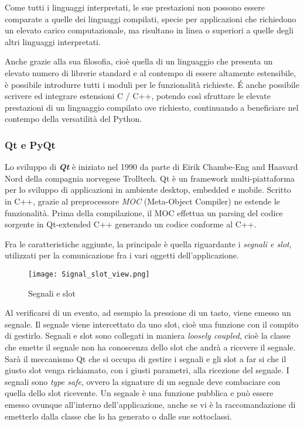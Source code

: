 Come tutti i linguaggi interpretati, le sue prestazioni non possono essere comparate a quelle dei linguaggi compilati, specie per applicazioni che richiedono un elevato carico computazionale, ma risultano in linea o superiori a quelle degli altri linguaggi interpretati.

Anche grazie alla sua filosofia, cioè quella di un linguaggio che presenta un elevato numero di librerie standard e al contempo di essere altamente estensibile, è possibile introdurre tutti i moduli per le funzionalità richieste. 
\'E anche possibile scrivere ed integrare estensioni C / C++, potendo così sfruttare le elevate prestazioni di un linguaggio compilato ove richiesto, continuando a beneficiare nel contempo della versatilità del Python.  

\subsubsection{Qt e PyQt} 
\nocite{Qt}
\nocite{PyQt}
Lo sviluppo di \textbf{\textit{Qt}} è iniziato nel 1990 da parte di Eirik Chambe-Eng and Haavard Nord della compagnia norvegese Trolltech. Qt è un framework multi-piattaforma per lo sviluppo di applicazioni in ambiente desktop, embedded e mobile. Scritto in C++, grazie al preprocessore \textit{MOC} (Meta-Object Compiler) ne estende le funzionalità.
Prima della compilazione, il MOC effettua un parsing del codice sorgente in Qt-extended C++ generando un codice conforme al C++. 

Fra le caratteristiche aggiunte, la principale è quella riguardante i \textit{segnali e slot}, utilizzati per la comunicazione fra i vari oggetti dell'applicazione. 

\begin{figure}[htpb]
	\begin{center}
		\texttt{[image: Signal\_slot\_view.png]}
	\end{center}
	\caption[Segnali e slot]{Segnali e slot \footnotemark}
\end{figure}


Al verificarsi di un evento, ad esempio la pressione di un tasto, viene emesso un segnale. Il segnale viene intercettato da uno slot, cioè una funzione con il compito di gestirlo. 
Segnali e slot sono collegati in maniera \textit{loosely coupled}, cioè la classe che emette il segnale non ha conoscenza dello slot che andrà a ricevere il segnale. Sarà il meccanismo Qt che si occupa di gestire i segnali e gli slot a far si che il giusto slot venga richiamato, con i giusti parametri, alla ricezione del segnale. I segnali sono \textit{type safe}, ovvero la signature di un segnale deve combaciare con quella dello slot ricevente. Un segnale è una funzione pubblica e può essere emesso ovunque all'interno dell'applicazione, anche se vi è la raccomandazione di emetterlo dalla classe che lo ha generato o dalle sue sottoclassi.

